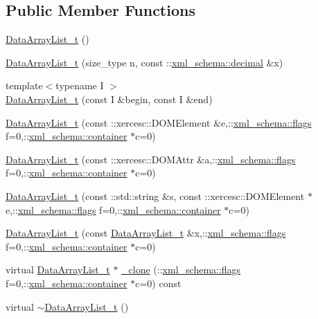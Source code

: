 \subsection*{Public Member Functions}
\begin{DoxyCompactItemize}
\item 
\hyperlink{classDataArrayList__t_a3ec10a5824450940e47a90c376fdb065}{Data\+Array\+List\+\_\+t} ()
\item 
\hyperlink{classDataArrayList__t_ad821001ed5f5f94f06712f5b0acab874}{Data\+Array\+List\+\_\+t} (size\+\_\+type n, const \+::\hyperlink{namespacexml__schema_a69bfaf24f63a8c18ebd8e21db6b343df}{xml\+\_\+schema\+::decimal} \&x)
\item 
{\footnotesize template$<$typename I $>$ }\\\hyperlink{classDataArrayList__t_a7b3c40bcc5d41bafc235a30ffa1a3b8f}{Data\+Array\+List\+\_\+t} (const I \&begin, const I \&end)
\item 
\hyperlink{classDataArrayList__t_ab596ca97e9666c979d1db13a4e032869}{Data\+Array\+List\+\_\+t} (const \+::xercesc\+::\+D\+O\+M\+Element \&e,\+::\hyperlink{namespacexml__schema_a0612287d030cb2732d31a45b258fdc87}{xml\+\_\+schema\+::flags} f=0,\+::\hyperlink{namespacexml__schema_ada9aa30dc722e93ee2ed7243085402a5}{xml\+\_\+schema\+::container} $\ast$c=0)
\item 
\hyperlink{classDataArrayList__t_a4cae1891a3ad2b9336b478fa436f4d3f}{Data\+Array\+List\+\_\+t} (const \+::xercesc\+::\+D\+O\+M\+Attr \&a,\+::\hyperlink{namespacexml__schema_a0612287d030cb2732d31a45b258fdc87}{xml\+\_\+schema\+::flags} f=0,\+::\hyperlink{namespacexml__schema_ada9aa30dc722e93ee2ed7243085402a5}{xml\+\_\+schema\+::container} $\ast$c=0)
\item 
\hyperlink{classDataArrayList__t_a360a3281299fcb02ad34ad0b2c2d15fd}{Data\+Array\+List\+\_\+t} (const \+::std\+::string \&s, const \+::xercesc\+::\+D\+O\+M\+Element $\ast$e,\+::\hyperlink{namespacexml__schema_a0612287d030cb2732d31a45b258fdc87}{xml\+\_\+schema\+::flags} f=0,\+::\hyperlink{namespacexml__schema_ada9aa30dc722e93ee2ed7243085402a5}{xml\+\_\+schema\+::container} $\ast$c=0)
\item 
\hyperlink{classDataArrayList__t_af44b66e9ba5c6f84a3a0cca1c0fc98dc}{Data\+Array\+List\+\_\+t} (const \hyperlink{classDataArrayList__t}{Data\+Array\+List\+\_\+t} \&x,\+::\hyperlink{namespacexml__schema_a0612287d030cb2732d31a45b258fdc87}{xml\+\_\+schema\+::flags} f=0,\+::\hyperlink{namespacexml__schema_ada9aa30dc722e93ee2ed7243085402a5}{xml\+\_\+schema\+::container} $\ast$c=0)
\item 
virtual \hyperlink{classDataArrayList__t}{Data\+Array\+List\+\_\+t} $\ast$ \hyperlink{classDataArrayList__t_acec29e88488ded1352c5b064827f5c38}{\+\_\+clone} (\+::\hyperlink{namespacexml__schema_a0612287d030cb2732d31a45b258fdc87}{xml\+\_\+schema\+::flags} f=0,\+::\hyperlink{namespacexml__schema_ada9aa30dc722e93ee2ed7243085402a5}{xml\+\_\+schema\+::container} $\ast$c=0) const 
\item 
virtual \hyperlink{classDataArrayList__t_aee3c16237122c72a9c163847232d830f}{$\sim$\+Data\+Array\+List\+\_\+t} ()
\end{DoxyCompactItemize}


